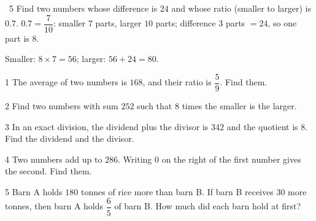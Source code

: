 \gap
\begin{exbox}{\ExWord\ 5}
Find two numbers whose difference is $24$ and whose ratio (smaller to larger) is $0.7$.
\guide
$0.7=\dfrac7{10}$: smaller $7$ parts, larger $10$ parts; difference $3$ parts $=24$, so one part is $8$.\par
Smaller: $8\times7=56$; larger: $56+24=80$.
\end{exbox}
\begin{probbox}{1}{\relax}
The average of two numbers is $168$, and their ratio is $\dfrac59$. Find them.
\end{probbox}
\gap
\begin{probbox}{2}{\relax}
Find two numbers with sum $252$ such that $8$ times the smaller is the larger.
\end{probbox}
\gap
\begin{probbox}{3}{\relax}
In an exact division, the dividend plus the divisor is $342$ and the quotient is $8$. Find the dividend and the divisor.
\end{probbox}
\gap
\begin{probbox}{4}{\relax}
Two numbers add up to $286$. Writing $0$ on the right of the first number gives the second. Find them.
\end{probbox}
\gap
\begin{probbox}{5}{\relax}
Barn A holds $180$ tonnes of rice more than barn B. If barn B receives $30$ more tonnes, then barn A holds $\dfrac65$ of barn B. How much did each barn hold at first?
\end{probbox}
